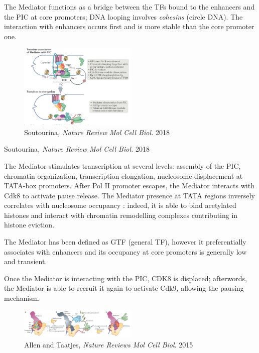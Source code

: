 The Mediator functions as a bridge between the TFs bound to the enhancers and the PIC at core promoters; DNA looping involves \emph{cohesins} (circle DNA). The interaction with enhancers occurs first and is more stable than the core promoter one.

\begin{figure}
\centering
\includegraphics[width=0.5\textwidth]{../_resources/Screenshot_2022-10-07_at_10-54-13.png}
\caption{Soutourina\emph{, Nature Review Mol Cell Biol.} 2018}
\end{figure}

Soutourina\emph{, Nature Review Mol Cell Biol.} 2018

The Mediator stimulates transcription at several levels: assembly of the PIC, chromatin organization, transcription elongation, nucleosome displacement at TATA-box promoters. After Pol II promoter escapes, the Mediator interacts with Cdk8 to activate pause release. The Mediator presence at TATA regions inversely correlates with nucleosome occupancy : indeed, it is able to bind acetylated histones and interact with chromatin remodelling complexes contributing in histone eviction.

The Mediator has been defined as GTF (general TF), however it preferentially associates with enhancers and its occupancy at core promoters is generally low and transient.

Once the Mediator is interacting with the PIC, CDK8 is displaced; afterwords, the Mediator is able to recruit it again to activate Cdk9, allowing the pausing mechanism.

\begin{figure}
\centering
\includegraphics[width=0.5\textwidth]{../_resources/Screenshot_2022-10-10_at_11-03-13.png}
\caption{Allen and Taatjes, \emph{Nature Reviews Mol Cell Biol}. 2015}
\end{figure}

